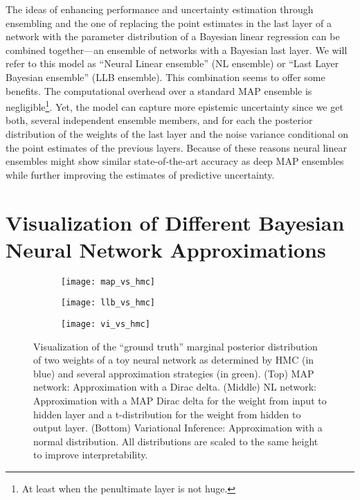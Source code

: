 \documentclass[../thesis.tex]{subfiles}
\begin{document}
\label{neural-linear-ensemble}
The ideas of enhancing performance and uncertainty estimation through ensembling and the one of replacing the point estimates in the last layer of a network with the parameter distribution of a Bayesian linear regression can be combined together---an ensemble of networks with a Bayesian last layer. We will refer to this model as ``Neural Linear ensemble'' (NL ensemble) or ``Last Layer Bayesian ensemble'' (LLB ensemble). This combination seems to offer some benefits. The computational overhead over a standard MAP ensemble is negligible\footnote{At least when the penultimate layer is not huge.}. Yet, the model can capture more epistemic uncertainty since we get both, several independent ensemble members, and for each the posterior distribution of the weights of the last layer and the noise variance conditional on the point estimates of the previous layers. Because of these reasons neural linear ensembles might show similar state-of-the-art accuracy as deep MAP ensembles while further improving the estimates of predictive uncertainty. 

\section{Visualization of Different Bayesian Neural Network Approximations}
\begin{figure}[h!]
    \centering
    \begin{subfigure}{0.9\textwidth}
    \texttt{[image: map\_vs\_hmc]} 
    \end{subfigure}

    \begin{subfigure}{0.9\textwidth}
    \texttt{[image: llb\_vs\_hmc]}
    \end{subfigure}
    
    \begin{subfigure}{0.9\textwidth}
    \texttt{[image: vi\_vs\_hmc]}
    \end{subfigure}

    \caption{Visualization of the ``ground truth'' marginal posterior distribution of two weights of a toy neural network as determined by HMC (in blue) and several approximation strategies (in green). (Top) MAP network: Approximation with a Dirac delta. (Middle) NL network: Approximation with a MAP Dirac delta for the weight from input to hidden layer and a t-distribution for the weight from hidden to output layer. (Bottom) Variational Inference: Approximation with a normal distribution. All distributions are scaled to the same height to improve interpretability.}
    \label{fig:weight-space-approximations-1}
\end{figure}
\end{document}
